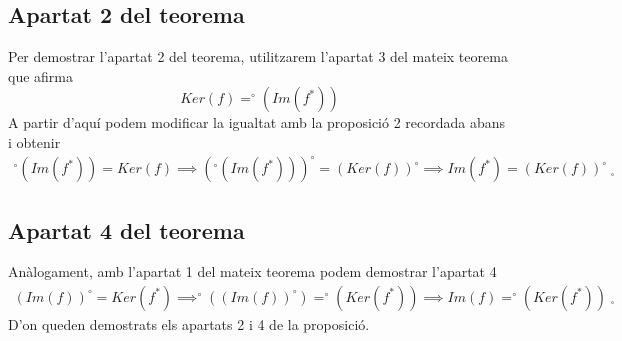 \documentclass[a4paper, 11pt]{article}
\begin{document}
    \subsection*{Apartat 2 del teorema}
    Per demostrar l'apartat 2 del teorema, utilitzarem l'apartat 3 del mateix teorema que afirma
    $$
        Ker(f) = ^\circ (Im(f^*))
    $$
    A partir d'aqu\'i podem modificar la igualtat amb la proposici\'o 2 recordada abans i obtenir
    \begin{gather*}
        ^\circ(Im(f^*)) = Ker(f) \implies (^\circ (Im(f^*)))^\circ = (Ker(f))^\circ \implies Im(f^*) = (Ker(f))^\circ \; _\square
    \end{gather*}
    \subsection*{Apartat 4 del teorema}
    An\`alogament, amb l'apartat 1 del mateix teorema podem demostrar l'apartat 4
    \begin{gather*}
        (Im (f))^\circ = Ker(f^*) \implies ^\circ ((Im (f))^\circ) = ^\circ (Ker(f^*)) \implies Im (f) = ^\circ (Ker(f^*)) \; _\square
    \end{gather*}
    D'on queden demostrats els apartats 2 i 4 de la proposici\'o.
\end{document}
